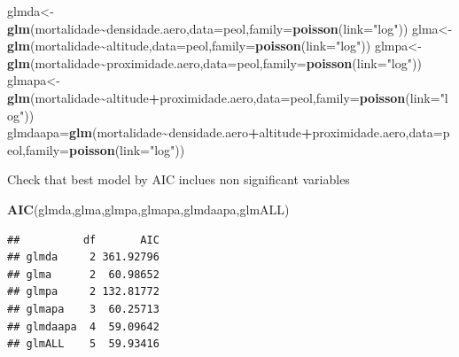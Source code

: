 \documentclass[
]{book}
\newenvironment{Shaded}{\begin{snugshade}}{\end{snugshade}}
\newcommand{\AttributeTok}[1]{\textcolor[rgb]{0.13,0.29,0.53}{#1}}
\newcommand{\FunctionTok}[1]{\textcolor[rgb]{0.13,0.29,0.53}{\textbf{#1}}}
\newcommand{\NormalTok}[1]{#1}
\newcommand{\OtherTok}[1]{\textcolor[rgb]{0.56,0.35,0.01}{#1}}
\newcommand{\SpecialCharTok}[1]{\textcolor[rgb]{0.81,0.36,0.00}{\textbf{#1}}}
\newcommand{\StringTok}[1]{\textcolor[rgb]{0.31,0.60,0.02}{#1}}
\begin{document}
\begin{Shaded}
\begin{Highlighting}[]
\NormalTok{glmda}\OtherTok{\textless{}{-}}\FunctionTok{glm}\NormalTok{(mortalidade}\SpecialCharTok{\textasciitilde{}}\NormalTok{densidade.aero,}\AttributeTok{data=}\NormalTok{peol,}\AttributeTok{family=}\FunctionTok{poisson}\NormalTok{(}\AttributeTok{link=}\StringTok{"log"}\NormalTok{))}
\NormalTok{glma}\OtherTok{\textless{}{-}}\FunctionTok{glm}\NormalTok{(mortalidade}\SpecialCharTok{\textasciitilde{}}\NormalTok{altitude,}\AttributeTok{data=}\NormalTok{peol,}\AttributeTok{family=}\FunctionTok{poisson}\NormalTok{(}\AttributeTok{link=}\StringTok{"log"}\NormalTok{))}
\NormalTok{glmpa}\OtherTok{\textless{}{-}}\FunctionTok{glm}\NormalTok{(mortalidade}\SpecialCharTok{\textasciitilde{}}\NormalTok{proximidade.aero,}\AttributeTok{data=}\NormalTok{peol,}\AttributeTok{family=}\FunctionTok{poisson}\NormalTok{(}\AttributeTok{link=}\StringTok{"log"}\NormalTok{))}
\NormalTok{glmapa}\OtherTok{\textless{}{-}}\FunctionTok{glm}\NormalTok{(mortalidade}\SpecialCharTok{\textasciitilde{}}\NormalTok{altitude}\SpecialCharTok{+}\NormalTok{proximidade.aero,}\AttributeTok{data=}\NormalTok{peol,}\AttributeTok{family=}\FunctionTok{poisson}\NormalTok{(}\AttributeTok{link=}\StringTok{"log"}\NormalTok{))}
\NormalTok{glmdaapa}\OtherTok{=}\FunctionTok{glm}\NormalTok{(mortalidade}\SpecialCharTok{\textasciitilde{}}\NormalTok{densidade.aero}\SpecialCharTok{+}\NormalTok{altitude}\SpecialCharTok{+}\NormalTok{proximidade.aero,}\AttributeTok{data=}\NormalTok{peol,}\AttributeTok{family=}\FunctionTok{poisson}\NormalTok{(}\AttributeTok{link=}\StringTok{"log"}\NormalTok{))}
\end{Highlighting}
\end{Shaded}

Check that best model by AIC inclues non significant variables

\begin{Shaded}
\begin{Highlighting}[]
\FunctionTok{AIC}\NormalTok{(glmda,glma,glmpa,glmapa,glmdaapa,glmALL)}
\end{Highlighting}
\end{Shaded}

\begin{verbatim}
##          df       AIC
## glmda     2 361.92796
## glma      2  60.98652
## glmpa     2 132.81772
## glmapa    3  60.25713
## glmdaapa  4  59.09642
## glmALL    5  59.93416
\end{verbatim}
\end{document}
